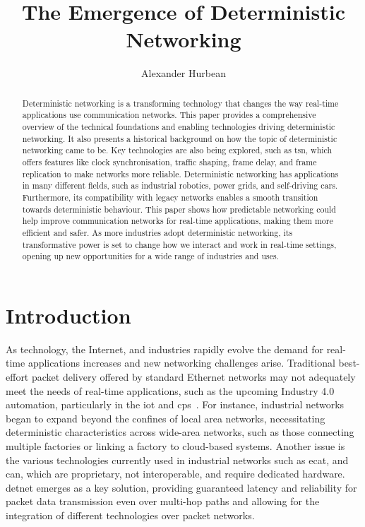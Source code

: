 \documentclass[runningheads]{llncs}
\begin{document}
\title{The Emergence of Deterministic Networking}
\author{Alexander Hurbean}

\maketitle              %

\begin{abstract}
  Deterministic networking is a transforming technology that changes the way real-time applications use communication networks. This paper provides a comprehensive overview of the technical foundations and enabling technologies driving deterministic networking. It also presents a historical background on how the topic of deterministic networking came to be. Key technologies are also being explored, such as \gls{tsn}, which offers features like clock synchronisation, traffic shaping, frame delay, and frame replication to make networks more reliable. Deterministic networking has applications in many different fields, such as industrial robotics, power grids, and self-driving cars. Furthermore, its compatibility with legacy networks enables a smooth transition towards deterministic behaviour. This paper shows how predictable networking could help improve communication networks for real-time applications, making them more efficient and safer. As more industries adopt deterministic networking, its transformative power is set to change how we interact and work in real-time settings, opening up new opportunities for a wide range of industries and uses.
  
\end{abstract}

\section{Introduction}

As technology, the Internet, and industries rapidly evolve the demand for real-time applications increases and new networking challenges arise. Traditional best-effort packet delivery offered by standard Ethernet networks may not adequately meet the needs of real-time applications, such as the upcoming Industry 4.0 automation, particularly in the \gls{iot} and \gls{cps}~\cite{Wollschlaeger2017}. For instance, industrial networks began to expand beyond the confines of local area networks, necessitating deterministic characteristics across wide-area networks, such as those connecting multiple factories or linking a factory to cloud-based systems. Another issue is the various technologies currently used in industrial networks such as \gls{ecat}, and \gls{can}, which are proprietary, not interoperable, and require dedicated hardware. \gls{detnet} emerges as a key solution, providing guaranteed latency and reliability for packet data transmission even over multi-hop paths and allowing for the integration of different technologies over packet networks.
\end{document}
